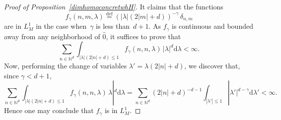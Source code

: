 \documentclass[10pt]{amsart}
\theoremstyle{definition}\newtheorem{defi}[theo]{Definition}\newtheorem{rema}[theo]{Remark}\newtheorem{exam}[theo]{Example}\newtheorem{exem}[theo]{Example}\newtheorem{nota}[theo]{Notation}
\newcommand{\lam}{\lambda}
\newcommand{\wh}{\widehat}
\newcommand*\N{\mathbb{N}}
\newcommand*\eqdefa{\overset{\mathrm{def}}{=}}
\newcommand*{\dd}{\mathrm{d}}
\newcommand{\dlam}{\dd \lambda}
\begin{document}
\begin{proof}[Proof of Proposition~\ref{dimhomoconcretwhH}] It claims that the functions
\[
f_\gamma (n,m,\lam) \eqdefa \left(|\lam| (2|m|+d)\right) ^{-\gamma} \, \delta_{n,m}
\]
are in $L^1_M$ in the case when~$\gamma$ is less than~$d+1$. As $f_\gamma$ is continuous and bounded away from any neighborhood of $\wh 0$, it suffices to prove that
\[
\sum_{n\in \N^d} \int_{|\lam| (2|n|+d)\leq 1} f_\gamma(n,n,\lam)\, |\lam|^d \dlam <\infty.
\]
Now, performing the change of variables $ \lam' = \lam (2|n|+d)$, we discover that, since $\gamma<d+1$,
\[
\sum_{n\in \N^d} \int_{|\lam| (2|n|+d)\leq 1} f_\gamma(n,n,\lam)\,\lam|^d \dlam = \sum_{n\in \N^d} (2|n|+d)^{-d-1} \int_{|\lam'|\leq 1} |\lam'| ^{d-\gamma} \dlam'<\infty.
\]
Hence one may conclude that $f_\gamma$ is in $L^1_M$.
\end{proof}
\end{document}
